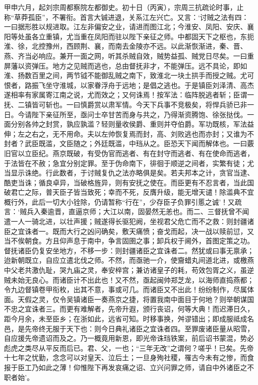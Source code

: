 \documentclass[]{article}
\begin{document}
甲申六月，起刘宗周都察院左都御史。初十日（丙寅），宗周三抗疏论时事，止称``草莽孤臣''，不署衔。首言大铖进退，关系江左兴亡。又言：`讨贼之法有四：一曰据形胜以规进取。江左非偏安之业，请进而图江北；今淮安、凤阳、安庆、襄阳等处虽各立重镇，尤当重在凤阳而驻以陛下亲征之师。中都固天下之枢也，东扼淮、徐，北控豫州，西顾荆、襄，而南去金陵亦不远。以此渐恢渐进，秦、晋、燕、齐当必响应。兼开一面之网，听其杀贼自效，贼势益孤、贼党日尽矣。一曰重屏藩以资弹压。地方之见贼而逃也，总由督抚非才，不能弹压。远不具论，即如淮、扬数百里之间，两节钺不能御乱贼之南下，致淮北一块土拱手而授之贼。尤可恨者，路振飞坐守淮城，以家眷浮舟于远地；是倡之逃也。于是镇臣刘泽清、高杰遂相率有家属寄江南之说，尤而效之；又何诛焉！按军法：临阵脱逃者斩；臣谓一抚、二镇皆可斩也。一曰慎爵赏以肃军情。今天下兵事不竞极矣，将悍兵骄已非一日。今请陛下亲征所至，亟问士卒甘苦而身与共之，乃得渐资腾饱、徐张挞伐。一面分别各帅之封赏，孰应孰滥？轻则量收侯爵、重则并夺伯爵。军功既核，军法益伸；左之右之，无不用命。夫以左帅恢复焉而封，高、刘败逃也而亦封；又谁为不封者？武臣既滥，文臣随之；外廷既滥，中珰从之。臣恐天下闻而解体也。一曰覈旧官以立臣纪。燕京既破，有受伪官而逃者、有在封守而逃者、有在使命而逃者，于法皆在不赦；急宜分别定罪。至于伪命南下，徘徊于顺逆之间者，实繁有徒；尤当显示诛绝。行此数者，于讨贼复仇之法亦略俱是矣。若夫邦本之计，贪官当逮、酷吏当诛；循良卓异，当破格旌异，则有安抚之使在。而臣更有不忍言者，当此国破君亡之际，普天臣子皆当致死；幸而不死，反膺升级，能无增天谴！除滥典不宜概行外，此后一切大小铨除，仍请暂称``行在''，少存臣子负罪引慝之诚'！又疏言：`贼兵入秦逾晋，直逼京师；大江以南，固晏然无恙也。而二、三督抚曾不闻遣一人一骑北进，以壮声援；贼遂得长驱犯阙，坐视君父危亡而不之救：则封疆诸臣之宜诛者一。既而大行之凶问确矣，敷天痛愤；奋戈而起，决一战以赎前愆，又当不俟朝食。方且仰声息于南中，争言固圉之事；卸兵权于阃外，首图定策之功。督抚诸臣仍复安坐地方，不移一步：则封疆诸臣之宜诛者二。然犹或曰事无禀承；迨新朝既立，自应立遣北伐之师。不然，而亟驰一介，使齎蜡丸间道北进，或檄燕中父老共激仇耻，哭九庙之灵，奉安梓宫；兼访诸皇子的耗，苟效包胥之义，虽逆贼未始无良心。而诸臣计不出此也！又不然，亟起闽帅郑芝龙，以海师直捣燕都；令九边督镇卷甲衔枚，出其不意，事或可几。而诸臣又不出此！纷纷制作，尽属体面。天假之灵，仅令吴镇诸臣一奏燕京之捷，将置我南中面目于何地？则举朝谋国不忠之宜诛者三。而更有难解者，先帝升遐，颁行丧诏，何等大典！而迟滞日久，距今月余，未至臣乡；在浙如此，远省可知。时移事换，舛谬错出；即成服祗成名邑，是先帝终无服于天下也：则今日典礼诸臣之宜诛者四。至罪废诸臣量从昭雪，自应援先帝遗诏而及之。乃一概竟用新恩，即光帝诛珰铁案，前后诏书蒙混，势必彪虎之类尽从平反而后已。君、父，一也；``三年无改''之谓何？嗟乎！已矣。先帝十七年之忧勤，念念可以对皇天、泣后土；一旦身殉社稷，罹古今未有之惨，而食报于臣工乃如此之薄！仰惟陛下再发哀痛之诏、立兴问罪之师，请自中外诸臣之不职者始'。
\end{document}
